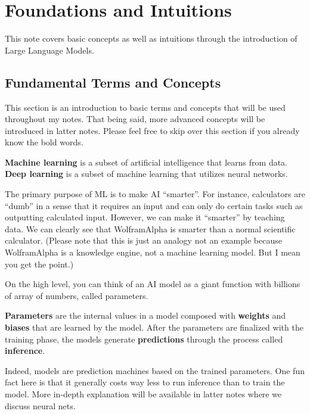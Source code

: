 \documentclass[../../../main.tex]{subfiles}
\begin{document}
\chapter{Foundations and Intuitions}

This note covers basic concepts as well as intuitions through
the introduction of Large Language Models.

\section{Fundamental Terms and Concepts}

This section is an introduction to basic terms and concepts that
will be used throughout my notes. That being said, more advanced
concepts will be introduced in latter notes. Please feel free
to skip over this section if you already know the bold words.

\begin{definition}{}{}
\textbf{Machine learning} is a subset of artificial intelligence
that learns from data. \textbf{Deep learning} is a subset of
machine learning that utilizes neural networks.
\end{definition}

The primary purpose of ML is to make AI ``smarter''. For instance,
calculators are ``dumb'' in a sense that it requires an input and
can only do certain tasks such as outputting calculated input.
However, we can make it ``smarter'' by teaching data. We can clearly
see that WolframAlpha is smarter than a normal scientific calculator.
(Please note that this is just an analogy not an example because
WolframAlpha is a knowledge engine, not a machine learning model.
But I mean you get the point.)

On the high level, you can think of an AI model as a giant function
with billions of array of numbers, called parameters.

\begin{definition}{}{}
\textbf{Parameters} are the internal values in a model composed
with \textbf{weights} and \textbf{biases} that are learned by the
model. After the parameters are finalized with the training phase,
the models generate \textbf{predictions} through the process called
\textbf{inference}.
\end{definition}

Indeed, models are prediction machines based on the trained
parameters. One fun fact here is that it generally costs way less
to run inference than to train the model. More in-depth explanation
will be available in latter notes where we discuss neural nets.
\end{document}
